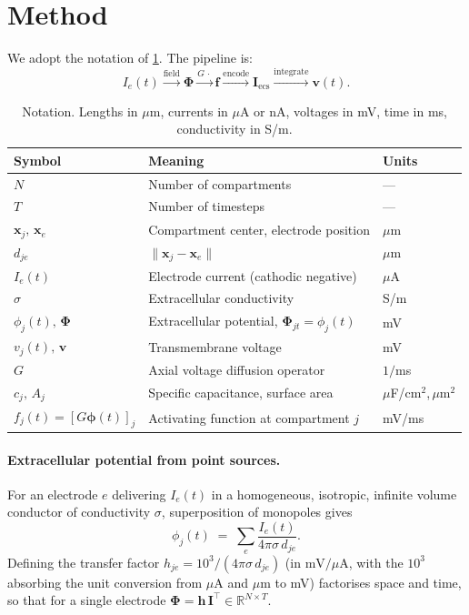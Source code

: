 \section{Method}\label{sec:method}

We adopt the notation of \cref{tab:notation}. The pipeline is:
\begingroup
\setlength{\abovedisplayskip}{4pt}
\setlength{\belowdisplayskip}{4pt}
\begin{equation}
  I_e(t) \xrightarrow{\text{field}} \boldsymbol{\Phi}
  \xrightarrow{G\,\cdot} \mathbf{f}
  \xrightarrow{\text{encode}} \mathbf{I}_{\text{ecs}}
  \xrightarrow{\text{integrate}} \mathbf{v}(t).
  \label{eq:pipeline}
\end{equation}
\endgroup

\begin{table}[t]
\centering
\small
\caption{Notation. Lengths in $\mu$m, currents in $\mu$A or nA, voltages
in mV, time in ms, conductivity in S/m.}
\label{tab:notation}
\begin{tabular}{@{}lll@{}}
\toprule
Symbol & Meaning & Units \\ \midrule
$N$ & Number of compartments & --- \\
$T$ & Number of timesteps & --- \\
$\mathbf{x}_j,\,\mathbf{x}_e$ & Compartment center, electrode position & $\mu$m \\
$d_{je}$ & $\lVert \mathbf{x}_j - \mathbf{x}_e \rVert$ & $\mu$m \\
$I_e(t)$ & Electrode current (cathodic negative) & $\mu$A \\
$\sigma$ & Extracellular conductivity & S/m \\
$\phi_j(t),\,\boldsymbol{\Phi}$ & Extracellular potential, $\boldsymbol{\Phi}_{jt}=\phi_j(t)$ & mV \\
$v_j(t),\,\mathbf{v}$ & Transmembrane voltage & mV \\
$G$ & Axial voltage diffusion operator & $1/$ms \\
$c_j,\,A_j$ & Specific capacitance, surface area & $\mu$F/cm$^2$,\,$\mu$m$^2$ \\
$f_j(t) = [G\boldsymbol{\phi}(t)]_j$ & Activating function at compartment $j$ & mV/ms \\
\bottomrule
\end{tabular}
\end{table}

\paragraph{Extracellular potential from point sources.}
For an electrode $e$ delivering $I_e(t)$ in a homogeneous, isotropic,
infinite volume conductor of conductivity $\sigma$, superposition of
monopoles gives
\[
  \phi_j(t) \;=\; \sum_e \frac{I_e(t)}{4\pi\sigma\,d_{je}}.
\]
Defining the transfer factor $h_{je} = 10^3 / (4\pi\sigma\,d_{je})$
(in $\mathrm{mV}/\mu\mathrm{A}$, with the $10^3$ absorbing the unit
conversion from $\mu$A and $\mu$m to mV) factorises space and time, so
that for a single electrode
$\boldsymbol{\Phi} = \mathbf{h}\,\mathbf{I}^\top \in \mathbb{R}^{N\times T}$.

